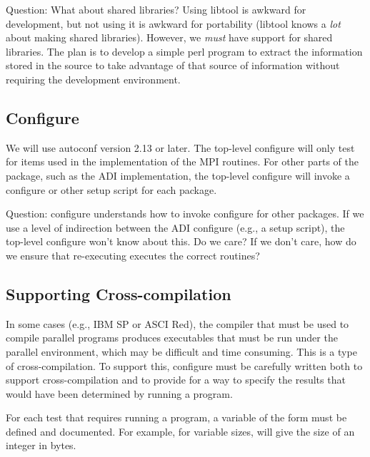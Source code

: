 \documentclass{article}
\begin{document}
Question: What about shared libraries?  Using libtool is awkward for
development, but not using it is awkward for portability (libtool
knows a \emph{lot} about making shared libraries).  However, we
\emph{must} have support for shared libraries.  The plan is to develop
a simple perl program to extract the information stored in the
 source to take advantage of that source of information
without requiring the  development environment.

\subsection{Configure}
We will use autoconf version 2.13 or later.  The top-level configure will only
test for items used in the implementation of the MPI routines.  For
other parts of the package, such as the ADI implementation, the
top-level configure will invoke a configure or other setup script for
each package.

Question: configure understands how to invoke configure for other
packages.  If we use a level of indirection between the ADI configure
(e.g., a setup script), the top-level configure won't know about
this.  Do we care?  If we don't care, how do we ensure that
re-executing  executes the correct routines?

\subsection{Supporting Cross-compilation}
In some cases (e.g., IBM SP or ASCI Red), the compiler that must be used to
compile parallel programs produces executables that must be run under
the parallel environment, which may be difficult and time consuming.
This is a type of cross-compilation.  To support this, configure must
be carefully written both to support cross-compilation and to provide
for a way to specify the results that would have been determined by
running a program.

For each test that requires running a program, a variable of the form
 must be defined and documented.  For example, for
variable sizes,  will give the size of an
integer in bytes.
\end{document}
